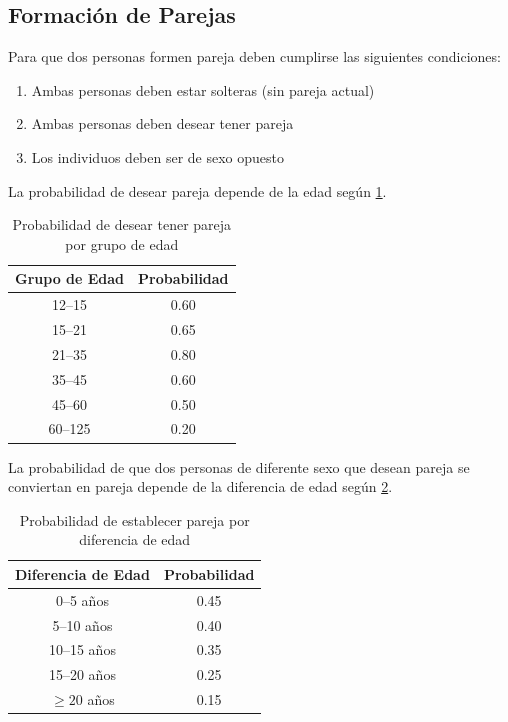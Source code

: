 \documentclass[12pt, a4paper, spanish]{report}
\begin{document}
\subsection{Formación de Parejas}

Para que dos personas formen pareja deben cumplirse las siguientes condiciones:

\begin{enumerate}
    \item Ambas personas deben estar solteras (sin pareja actual)
    \item Ambas personas deben desear tener pareja
    \item Los individuos deben ser de sexo opuesto
\end{enumerate}

La probabilidad de desear pareja depende de la edad según \ref{table:partner_wish}.

\begin{table}[h]
    \centering
    \caption{Probabilidad de desear tener pareja por grupo de edad}
    \begin{tabular}{|c|c|}
    \hline
    \textbf{Grupo de Edad} & \textbf{Probabilidad} \\
    \hline
    12--15 & 0.60 \\
    15--21 & 0.65 \\
    21--35 & 0.80 \\
    35--45 & 0.60 \\
    45--60 & 0.50 \\
    60--125 & 0.20 \\
    \hline
    \end{tabular}
    \label{table:partner_wish}
\end{table}

La probabilidad de que dos personas de diferente sexo que desean pareja se conviertan en pareja depende de la diferencia de edad según \ref{table:partner_by_age_diff}.

\begin{table}[h]
    \centering
    \caption{Probabilidad de establecer pareja por diferencia de edad}\label{table:partner_by_age_diff}
    \begin{tabular}{|c|c|}
    \hline
    \textbf{Diferencia de Edad} & \textbf{Probabilidad} \\
    \hline
    0--5 años & 0.45 \\
    5--10 años & 0.40 \\
    10--15 años & 0.35 \\
    15--20 años & 0.25 \\
    $\geq 20$ años & 0.15 \\
    \hline
    \end{tabular}
\end{table}
\end{document}
